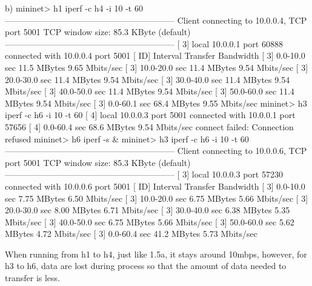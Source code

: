 					b)
							mininet> h1 iperf -c h4 -i 10 -t 60
							------------------------------------------------------------
							Client connecting to 10.0.0.4, TCP port 5001
							TCP window size: 85.3 KByte (default)
							------------------------------------------------------------
							[  3] local 10.0.0.1 port 60888 connected with 10.0.0.4 port 5001
							[ ID] Interval       Transfer     Bandwidth
							[  3]  0.0-10.0 sec  11.5 MBytes  9.65 Mbits/sec
							[  3] 10.0-20.0 sec  11.4 MBytes  9.54 Mbits/sec
							[  3] 20.0-30.0 sec  11.4 MBytes  9.54 Mbits/sec
							[  3] 30.0-40.0 sec  11.4 MBytes  9.54 Mbits/sec
							[  3] 40.0-50.0 sec  11.4 MBytes  9.54 Mbits/sec
							[  3] 50.0-60.0 sec  11.4 MBytes  9.54 Mbits/sec
							[  3]  0.0-60.1 sec  68.4 MBytes  9.55 Mbits/sec
							mininet> h3 iperf -c h6 -i 10 -t 60
							[  4] local 10.0.0.3 port 5001 connected with 10.0.0.1 port 57656
							[  4]  0.0-60.4 sec  68.6 MBytes  9.54 Mbits/sec
							connect failed: Connection refused
							mininet> h6 iperf -s &
							mininet> h3 iperf -c h6 -i 10 -t 60
							------------------------------------------------------------
							Client connecting to 10.0.0.6, TCP port 5001
							TCP window size: 85.3 KByte (default)
							------------------------------------------------------------
							[  3] local 10.0.0.3 port 57230 connected with 10.0.0.6 port 5001
							[ ID] Interval       Transfer     Bandwidth
							[  3]  0.0-10.0 sec  7.75 MBytes  6.50 Mbits/sec
							[  3] 10.0-20.0 sec  6.75 MBytes  5.66 Mbits/sec
							[  3] 20.0-30.0 sec  8.00 MBytes  6.71 Mbits/sec
							[  3] 30.0-40.0 sec  6.38 MBytes  5.35 Mbits/sec
							[  3] 40.0-50.0 sec  6.75 MBytes  5.66 Mbits/sec
							[  3] 50.0-60.0 sec  5.62 MBytes  4.72 Mbits/sec
							[  3]  0.0-60.4 sec  41.2 MBytes  5.73 Mbits/sec

						When running from h1 to h4, just like 1.5a, it stays around 10mbps, however, for h3 to h6, data are lost during process so that the amount of data needed to transfer is less. 



